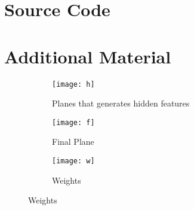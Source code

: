 \documentclass[12pt]{amsart}
\begin{document}
\section{Source Code}




\section{Additional Material}

\begin{figure}[H]
\begin{subfigure}{.5\textwidth}
  \centering
  \texttt{[image: h]}
  \caption{Planes that generates hidden features}
  \label{fig:sfig2}
\end{subfigure}

\begin{subfigure}{.5\textwidth}
  \centering
  \texttt{[image: f]}
  \caption{Final Plane}
  \label{fig:sfig2}
\end{subfigure}

\begin{subfigure}{.5\textwidth}
  \centering
  \texttt{[image: w]}
  \caption{Weights}
  \label{fig:sfig2}
\end{subfigure}
\label{fig:fig}


\end{figure}
\end{document}
